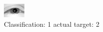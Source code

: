 \begin{figure}[h!]
\begin{center}
\includegraphics[width=0.60\columnwidth]{figures/ID2272_class_1_target_2.png}
\end{center}
\caption{ Classification: 1 actual target: 2}
\label{fig:ID2272_class_1_target_2}
\end{figure}
